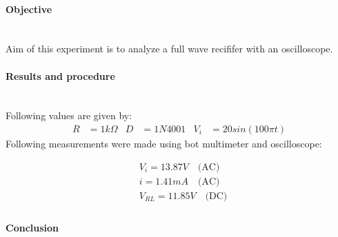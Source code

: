 \paragraph*{Objective} \hfill \\
Aim of this experiment is to analyze a full wave recififer with an oscilloscope.
\paragraph*{Results and procedure} \hfill\\
Following values are given by:
\begin{align*}
R&= 1k\Omega	&	D&= 1N4001	&	V_{i}&=20sin(100\pi t)
\end{align*}
Following measurements were made using bot multimeter and oscilloscope:

\begin{align*}
&V_{i}= 13.87V\,\,\,\,\,\,\text{(AC)} \\
&i= 1.41mA\,\,\,\,\,\,\text{(AC)} \\
&V_{RL}=11.85 V\,\,\,\,\,\,\text{(DC)} \\
\end{align*}

\paragraph*{Conclusion} \hfill \\
